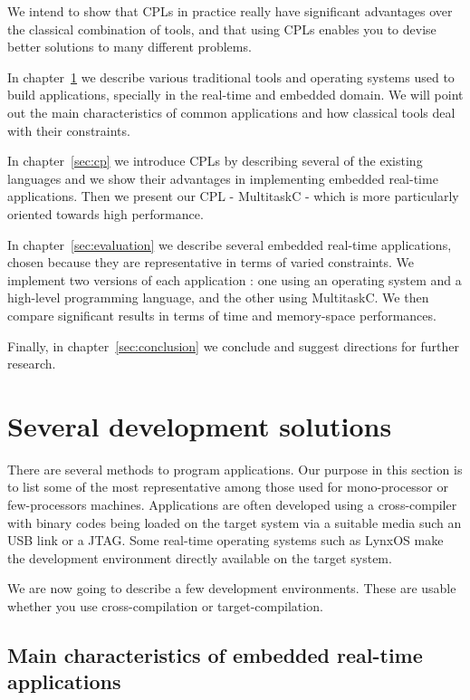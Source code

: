 \documentclass[10pt]{report}
\begin{document}
We intend to show that CPLs in practice really have significant
advantages over the classical combination of tools, and that using
CPLs enables you to devise better solutions to many different problems.

In chapter~\ref{sec:related} we describe various traditional tools
and operating systems used to build applications, specially in
the real-time and embedded domain. We will point out the main
characteristics of common applications and how classical tools
deal with their constraints.

In chapter~\ref{sec:cp} we introduce CPLs by describing several of
the existing languages and we show their advantages in
implementing embedded real-time applications. Then we present our
CPL - MultitaskC - which is more particularly oriented towards
high performance.

In chapter~\ref{sec:evaluation} we describe several embedded
real-time applications, chosen because they are representative in
terms of varied constraints. We implement two versions of each 
application : one using an operating system and a
high-level programming language, and the other using MultitaskC.
We then compare significant results in terms of time and
memory-space performances.

Finally, in chapter~\ref{sec:conclusion} we conclude and suggest
directions for further research.

\chapter{Several development solutions}
\label{sec:related}

There are several methods to program applications. Our purpose in
this section is to list some of the most representative among
those used for mono-processor or few-processors machines.
Applications are often developed using a cross-compiler with
binary codes being loaded on the target system via a suitable
media such an USB link or a JTAG. Some real-time operating
systems such as LynxOS make the development environment directly
available on the target system.

We are now going to describe a few development environments.
These are usable whether you use cross-compilation or
target-compilation.

\section{Main characteristics of embedded real-time applications}
\end{document}

